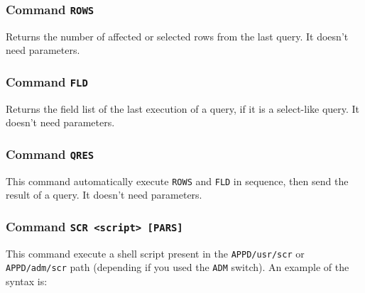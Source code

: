 \documentclass[12pt,titlepage]{book}
\newcommand{\mcs}{\textbf{MCS} }
\begin{document}
\subsubsection{Command \tt{ROWS}}
Returns the number of affected or selected rows from the last query. It
doesn't need parameters.

\subsubsection{Command \tt{FLD}}
Returns the field list of the last execution of a query, if it is a
select-like query. It doesn't need parameters.

\subsubsection{Command \tt{QRES}}
This command automatically execute \verb|ROWS| and \verb|FLD| in sequence,
then send the result of a query. It doesn't need parameters.

%


\subsubsection{Command \tt{SCR <script> [PARS]}}
This command execute a shell script present in the \verb|APPD/usr/scr| or
\verb|APPD/adm/scr| path (depending if you used the \verb|ADM| switch). An
example of the syntax is:
\end{document}
